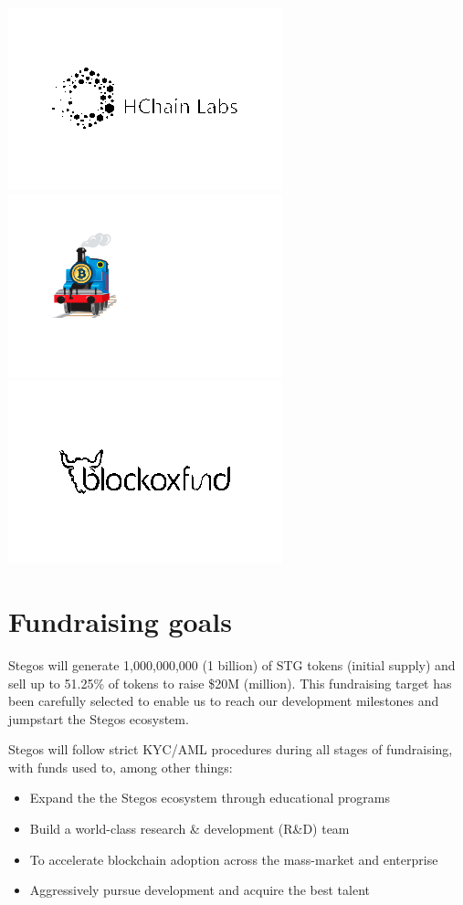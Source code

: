 \documentclass[8pt,fleqn,openany]{book}
\begin{document}
{{\begin{multicols}{7}[\columnsep=1cm]
	\includegraphics[scale=\imgscale]{images/partners/partners-5.png}
	\columnbreak
	\includegraphics[scale=\imgscale]{images/partners/partners-6.png}
	\columnbreak
	\includegraphics[scale=\imgscale]{images/partners/partners-7.png}
\end{multicols}
}

\section{Fundraising goals}
Stegos will generate 1,000,000,000 (1 billion) of STG tokens (initial supply) and sell up to 51.25\% of tokens to raise \$20M (million). This fundraising target has been carefully selected to enable us to reach our development milestones and jumpstart the Stegos ecosystem.

Stegos will follow strict KYC/AML procedures during all stages of fundraising, with funds used to, among other things:

\begin{itemize}
	\item Expand the the Stegos ecosystem through educational programs
	\item Build a world-class research \& development (R\&D) team
	\item To accelerate blockchain adoption across the mass-market and enterprise
	\item Aggressively pursue development and acquire the best talent
\end{itemize}

}
\end{document}
